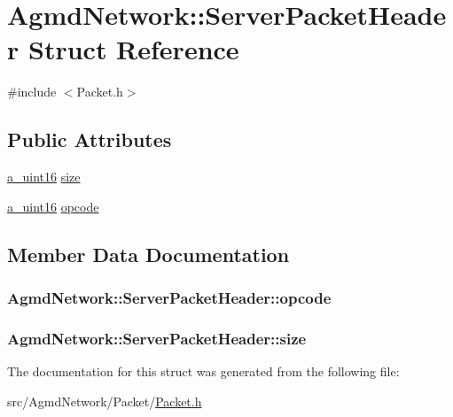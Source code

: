 \hypertarget{struct_agmd_network_1_1_server_packet_header}{\section{Agmd\+Network\+:\+:Server\+Packet\+Header Struct Reference}
\label{struct_agmd_network_1_1_server_packet_header}
}


{\ttfamily \#include $<$Packet.\+h$>$}

\subsection*{Public Attributes}
\begin{DoxyCompactItemize}
\item 
\hyperlink{_common_defines_8h_a7e7afab9b2de210021aed9953c6b367f}{a\+\_\+uint16} \hyperlink{struct_agmd_network_1_1_server_packet_header_ae81ed481dc936df231407f4a273aca1f}{size}
\item 
\hyperlink{_common_defines_8h_a7e7afab9b2de210021aed9953c6b367f}{a\+\_\+uint16} \hyperlink{struct_agmd_network_1_1_server_packet_header_acb3ec3c5575419eaffdfacbd45f9b2ee}{opcode}
\end{DoxyCompactItemize}


\subsection{Member Data Documentation}
\hypertarget{struct_agmd_network_1_1_server_packet_header_acb3ec3c5575419eaffdfacbd45f9b2ee}{
\subsubsection[{opcode}]{ Agmd\+Network\+::\+Server\+Packet\+Header\+::opcode}}\label{struct_agmd_network_1_1_server_packet_header_acb3ec3c5575419eaffdfacbd45f9b2ee}
\hypertarget{struct_agmd_network_1_1_server_packet_header_ae81ed481dc936df231407f4a273aca1f}{
\subsubsection[{size}]{ Agmd\+Network\+::\+Server\+Packet\+Header\+::size}}\label{struct_agmd_network_1_1_server_packet_header_ae81ed481dc936df231407f4a273aca1f}


The documentation for this struct was generated from the following file\+:\begin{DoxyCompactItemize}
\item 
src/\+Agmd\+Network/\+Packet/\hyperlink{_packet_8h}{Packet.\+h}\end{DoxyCompactItemize}
